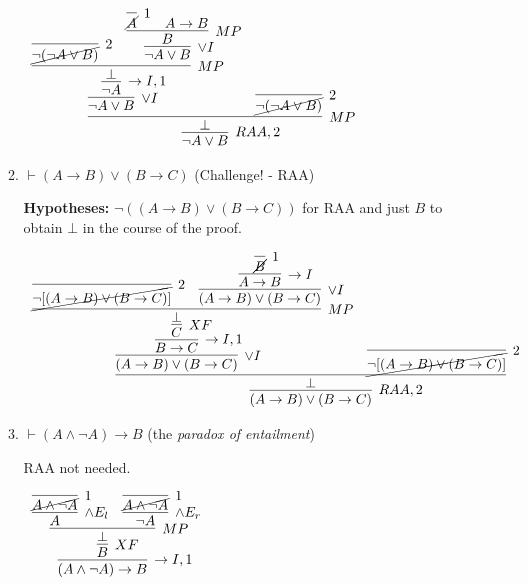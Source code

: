 \documentclass[11pt]{report}
\begin{document}
\begin{enumerate}
\begin{enumerate}
		\begin{mdframed}
			\begin{center}
				$\begin{array}{c}
					\infer[RAA,2]{\lnot A \lor B}
						{\infer[MP]{\bot}
							{\infer[\lor I]{\lnot A \lor B}
								{\infer[\to I,1]{\lnot A}
									{\infer[MP]{\bot}
										{\infer[2]{\cancel{\lnot(\lnot A \lor B)}}{}
										&
										\infer[\lor I]{\lnot A \lor B}
											{\infer[MP]{B}
												{\infer[1]{\cancel{A}}{}
												&
												A \to B}}}}}
							&
							\infer[2]{\cancel{\lnot(\lnot A \lor B)}}{}}}
				\end{array}$
			\end{center}
		\end{mdframed}

		\item $\vdash  (A \to  B) \lor (B \to  C)$ \hfill (Challenge! - RAA)

		{\bf Hypotheses:} $\lnot(( A \to  B) \lor ( B \to  C))$ for RAA and just $B$ to obtain $\bot$ in the course of the proof. 	

		\hspace{0.2cm}{\bf Solution}
			\begin{center}
				$\begin{array}{c}
					\infer[RAA,2]{(A \to B) \lor (B \to C)}
						{\infer[]{\bot}
							{\infer[\lor I]{(A \to B) \lor (B \to C)}
								{\infer[\to I,1]{B \to C}
									{\infer[XF]{C}
										{\infer[MP]{\bot}
											{\infer[2]{\cancel{\lnot[(A \to B) \lor (B \to C)]}}{}
											&
											\infer[\lor I]{(A \to B) \lor (B \to C)}
												{\infer[\to I]{A \to B}
													{\infer[1]{\cancel{B}}{}}}}}}}
							&
							\infer[2]{\cancel{\lnot[(A \to B) \lor (B \to C)]}}{}}}				
				\end{array}$
			\end{center}

		\newpage
		\item \(\vdash (A \land \neg A) \to  B\) \hfill (the \emph{paradox of entailment})
		
		\hspace{0.2cm}{\bf Solution}

		RAA not needed. 

		\begin{mdframed}
			\begin{center}
				$\begin{array}{c}
					\infer[\to I,1]{(A \land \lnot A) \to B}
						{\infer[XF]{B}
							{\infer[MP]{\bot}
								{\infer[\land E_{l}]{A}
									{\infer[1]{\cancel{A \land \lnot A}}{}}
								&
								\infer[\land E_{r}]{\lnot A}
									{\infer[1]{\cancel{A \land \lnot A}}{}}}}}
				\end{array}$
			\end{center}
		\end{mdframed}


\end{enumerate}
\end{enumerate}
\end{document}
